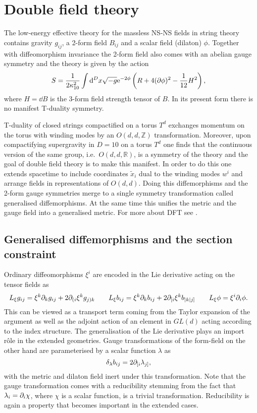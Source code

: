 \chapter{Double field theory}\label{sec:DFT}
The low-energy effective theory for the massless NS-NS fields in string theory contains gravity $g_{ij}$, a 2-form field $B_{ij}$ and a scalar field (dilaton) $\phi$. Together with diffeomorphism invariance the 2-form field also comes with an abelian gauge symmetry and the theory is given by the action 
\begin{equation}
    S = \frac{1}{2\kappa_{10}^2}\int \mathrm{d} ^Dx \sqrt{-g}\mathrm{e}^{-2\phi}\left(R+4(\partial\phi)^2-\frac{1}{12}H^2\right),
\end{equation}
where $H=\dd B$ is the 3-form field strength tensor of $B$. In its present form there is no manifest T-duality symmetry. 

T-duality of closed strings compactified on a torus $T^d$ exchanges momentum on the torus with winding modes by an $O(d,d,\mathbb{Z})$ transformation. Moreover, upon compactifying supergravity in $D=10$ on a torus $T^d$ one finds that the continuous version of the same group, i.e.\ $O(d,d,\mathbb{R})$, is a symmetry of the theory and the goal of double field theory is to make this manifest. In order to do this one extends spacetime to include coordinates $\tilde{x}_i$ dual to the winding modes $w^i$ and arrange fields in representations of $O(d,d)$. Doing this diffemorphisms and the 2-form gauge symmetries merge to a single symmetry transformation called generalised diffemorphisms. At the same time this unifies the metric and the gauge field into a generalised metric. For more about DFT see \cite{Berman2014,HohmZwiebach2013,DFTHullZwiebach2009,DFTAldazabal2013}. 


\section{Generalised diffemorphisms and the section constraint}
Ordinary diffeomorphisms $\xi^i$ are encoded in the Lie derivative acting on the tensor fields as 
\begin{equation}
    L_\xi g_{ij} = \xi^k\partial_kg_{ij}+2\partial_{(i}\xi^kg_{j)k} \qquad L_\xi b_{ij} = \xi^k\partial_k b_{ij} + 2 \partial_{[i}\xi^k b_{|k|j]} \qquad L_\xi \phi = \xi^i\partial_i\phi. 
\end{equation}
This can be viewed as a transport term coming from the Taylor expansion of the argument as well as the adjoint action of an element in $GL(d)$ acting according to the index structure. The generalisation of the Lie derivative plays an import rôle in the extended geometries. Gauge transformations of the form-field on the other hand are parameterised by a scalar function $\lambda$ as
\begin{equation}
    \delta_\lambda b_{ij} = 2\partial_{[i}\lambda_{j]},
\end{equation}
with the metric and dilaton field inert under this transformation. Note that the gauge transformation comes with a reducibility stemming from the fact that $\lambda_i = \partial_i \chi$, where $\chi$ is a scalar function, is a trivial transformation. Reducibility is again a property that becomes important in the extended cases. 

